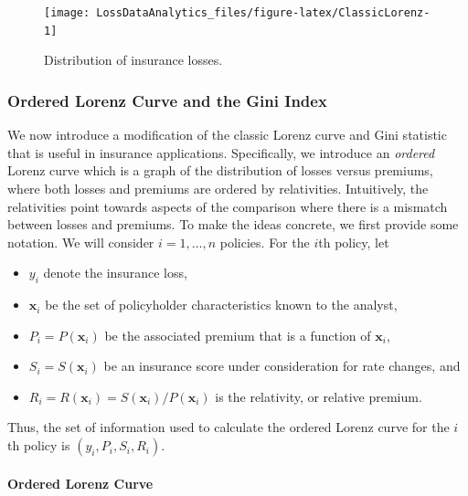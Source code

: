 \documentclass[]{book}
\providecommand{\tightlist}{%
  \setlength{\itemsep}{0pt}\setlength{\parskip}{0pt}}
\let\oldparagraph\paragraph
\renewcommand{\paragraph}[1]{\oldparagraph{#1}\mbox{}}
\theoremstyle{definition}
\theoremstyle{definition}
\theoremstyle{definition}
\theoremstyle{remark}
\begin{document}
\begin{figure}

{\centering \texttt{[image: LossDataAnalytics\_files/figure-latex/ClassicLorenz-1]} 

}

\caption{Distribution of insurance losses.}\label{fig:ClassicLorenz}
\end{figure}

\subsubsection{Ordered Lorenz Curve and the Gini
Index}\label{ordered-lorenz-curve-and-the-gini-index}

We now introduce a modification of the classic Lorenz curve and Gini
statistic that is useful in insurance applications. Specifically, we
introduce an \emph{ordered} Lorenz curve which is a graph of the
distribution of losses versus premiums, where both losses and premiums
are ordered by relativities. Intuitively, the relativities point towards
aspects of the comparison where there is a mismatch between losses and
premiums. To make the ideas concrete, we first provide some notation. We
will consider \(i=1, \ldots, n\) policies. For the \(i\)th policy, let

\begin{itemize}
\tightlist
\item
  \(y_i\) denote the insurance loss,
\item
  \(\mathbf{x}_i\) be the set of policyholder characteristics known to
  the analyst,
\item
  \(P_i=P(\mathbf{x}_i)\) be the associated premium that is a function
  of \(\mathbf{x}_i\),
\item
  \(S_i = S(\mathbf{x}_i)\) be an insurance score under consideration
  for rate changes, and
\item
  \(R_i = R(\mathbf{x}_i)=S(\mathbf{x}_i)/P(\mathbf{x}_i)\) is the
  relativity, or relative premium.
\end{itemize}

Thus, the set of information used to calculate the ordered Lorenz curve
for the \(i\)th policy is \((y_i, P_i, S_i, R_i)\).

\paragraph{Ordered Lorenz Curve}\label{ordered-lorenz-curve}
\end{document}
